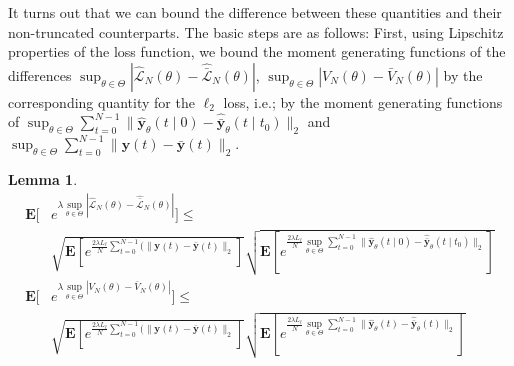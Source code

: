 \documentclass{article}
\def\rvy{{\mathbf{y}}}
\newtheorem{lemma}[theorem]{Lemma}
\newcommand{\y}{\mathbf{y}}
\newcommand{\bE}{\mathbf{E}}
\begin{document}
It turns out that we can bound the difference between these quantities and their non-truncated counterparts.
The basic steps are as follows:
First, using Lipschitz properties of the loss function, we bound the moment generating functions of
the differences $\sup_{\theta \in \Theta} |\hat{\mathcal{L}}_N(\theta) - \hat{\bar{\mathcal{L}}}_N(\theta)|$,
$\sup_{\theta \in \Theta}|V_N(\theta) - \bar{V}_N(\theta)|$ by the corresponding quantity for the $\ell_2$ loss, i.e.; by
the moment generating functions of 
$\sup_{\theta \in \Theta} \sum_{t=0}^{N-1} \|\hat{\rvy}_{\theta}(t \mid 0)-\hat{\bar{\rvy}}_{\theta}(t \mid t_0)\|_2$
and $\sup_{\theta \in \Theta} \sum_{t=0}^{N-1} \|\rvy(t)-\bar{\rvy}(t)\|_2$.
\begin{lemma}
\label{vl-bl:lemma0}
\begin{align}
    \bE[ & e^{\lambda \sup_{\theta \in \Theta}  |\hat{\mathcal{L}}_N(\theta) - \hat{\bar{\mathcal{L}}}_N(\theta)|}]
   \le  \nonumber \\
     & \sqrt{\bE[e^{\frac{2 \lambda L_{\ell}}{N} \sum_{t=0}^{N-1}
    (\|\y(t)-\bar{\y}(t)\|_2}]}
    \sqrt{\bE[e^{\frac{2\lambda L_{\ell}}{N} \sup_{\theta \in \Theta} 
    \sum_{t=0}^{N-1} \|\hat{\rvy}_{\theta}(t \mid 0)-\hat{\bar{\rvy}}_{\theta}(t \mid t_0)\|_2}]}
\label{vl-vbl:lemma1:pf:eq0} \\
    \bE[ & e^{\lambda \sup_{\theta \in \Theta}  |V_N(\theta) - \bar{V}_N(\theta)|}] 
   \le \nonumber \\
    & \sqrt{\bE[e^{\frac{2 \lambda L_{\ell}}{N} \sum_{t=0}^{N-1}
    (\|\y(t)-\bar{\y}(t)\|_2}] }\sqrt{\bE[e^{\frac{2 \lambda L_{\ell}}{N} \sup_{\theta \in \Theta} \sum_{t=0}^{N-1} \|\hat{\rvy}_{\theta}(t)-\hat{\bar{\rvy}}_{\theta}(t)\|_2}]}
\label{vl-vbl:lemma1:pf:eq3}
\end{align}
\end{lemma}
\end{document}
